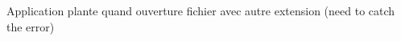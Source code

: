 
\begin{DoxyRefList}
\item[\label{bug__bug000001}%
\Hypertarget{bug__bug000001}%
Fichier \hyperlink{mainwindow_8cpp}{mainwindow.cpp} ]Application plante quand ouverture fichier avec autre extension (need to catch the error) 
\end{DoxyRefList}